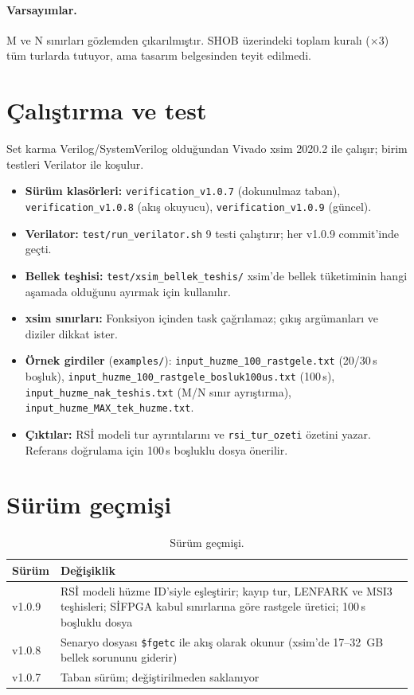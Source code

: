 \documentclass[11pt,a4paper]{article}
\newcommand{\us}{\,\textmu{}s}
\newcommand{\kod}[1]{\texttt{#1}}
\begin{document}
\paragraph{Varsayımlar.}
M ve N sınırları gözlemden çıkarılmıştır. SHOB üzerindeki toplam kuralı ($\times3$)
tüm turlarda tutuyor, ama tasarım belgesinden teyit edilmedi.

\section{Çalıştırma ve test}

Set karma Verilog/SystemVerilog olduğundan Vivado xsim 2020.2 ile çalışır; birim
testleri Verilator ile koşulur.

\begin{itemize}[nosep]
  \item \textbf{Sürüm klasörleri:} \kod{verification\_v1.0.7} (dokunulmaz taban),
        \kod{verification\_v1.0.8} (akış okuyucu), \kod{verification\_v1.0.9} (güncel).
  \item \textbf{Verilator:} \kod{test/run\_verilator.sh} 9 testi çalıştırır; her
        v1.0.9 commit'inde geçti.
  \item \textbf{Bellek teşhisi:} \kod{test/xsim\_bellek\_teshis/} xsim'de bellek
        tüketiminin hangi aşamada olduğunu ayırmak için kullanılır.
  \item \textbf{xsim sınırları:} Fonksiyon içinden task çağrılamaz; çıkış
        argümanları ve diziler dikkat ister.
  \item \textbf{Örnek girdiler} (\kod{examples/}):
        \kod{input\_huzme\_100\_rastgele.txt} (20/30\us{} boşluk),
        \kod{input\_huzme\_100\_rastgele\_bosluk100us.txt} (100\us),
        \kod{input\_huzme\_nak\_teshis.txt} (M/N sınır ayrıştırma),
        \kod{input\_huzme\_MAX\_tek\_huzme.txt}.
  \item \textbf{Çıktılar:} RSİ modeli tur ayrıntılarını ve \kod{rsi\_tur\_ozeti}
        özetini yazar. Referans doğrulama için 100\us{} boşluklu dosya önerilir.
\end{itemize}

\section{Sürüm geçmişi}

\begin{table}[h]
\centering
\begin{tabular}{@{}lp{12cm}@{}}
\toprule
Sürüm & Değişiklik \\
\midrule
v1.0.9 & RSİ modeli hüzme ID'siyle eşleştirir; kayıp tur, LENFARK ve MSI3 teşhisleri;
SİFPGA kabul sınırlarına göre rastgele üretici; 100\us{} boşluklu dosya \\
v1.0.8 & Senaryo dosyası \kod{\$fgetc} ile akış olarak okunur (xsim'de 17--32~GB
bellek sorununu giderir) \\
v1.0.7 & Taban sürüm; değiştirilmeden saklanıyor \\
\bottomrule
\end{tabular}
\caption{Sürüm geçmişi.}
\end{table}
\end{document}
